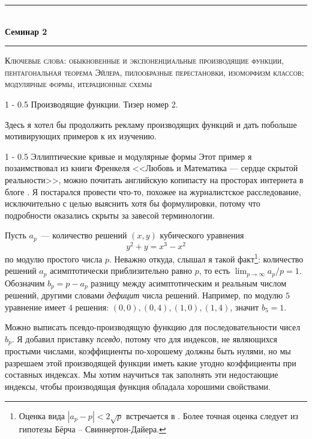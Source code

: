 \documentclass{article}
\makeatletter
\def \topic {Семинар 2}
\theoremstyle{definition}
\renewcommand{\section}{\@startsection
{section}%
{1}%
{\z@}%
{-\baselineskip}%
{0.5\baselineskip}%
{\centering\large\scshape}} %
\renewcommand{\subsection}{\@startsection
{subsection}%
{1}%
{\z@}%
{-\baselineskip}%
{0.5\baselineskip}%
{\centering\large\scshape}} %
\makeatother
\begin{document}
\begin{center}

\newcommand{\HRule}{\rule{\linewidth}{0.5mm}}
\HRule \\[0.2cm]
{ \Large \bfseries \topic} %
\HRule

\end{center}

\textsc{Ключевые слова: обыкновенные и экспоненциальные производящие функции, пентагональная теорема Эйлера, пилообразные перестановки, изоморфизм классов; модулярные формы, итерационные схемы}

\section{Производящие функции. Тизер номер 2.}

Здесь я хотел бы продолжить рекламу производящих функций и дать побольше 
мотивирующих примеров к их изучению. 

\subsection{Эллиптические кривые и модулярные формы}
Этот пример я позаимствовал из книги Френкеля <<Любовь и Математика --- сердце скрытой реальности>>, можно почитать английскую копипасту на просторах интернета в блоге \cite{shimura-taniyama}. Я постарался провести что-то, похожее на журналистское расследование, исключительно с целью выяснить хотя бы формулировки, потому что подробности оказались скрыты за завесой терминологии.

Пусть \( a_p \)~--- количество решений \( (x, y) \) кубического уравнения
\[
	y^2 + y = x^3 - x^2
\]
по модулю простого числа \( p \). Неважно откуда, слышал я такой факт\footnote{Оценка вида \( |a_p - p| < 2 \sqrt p \) встречается в \cite[Theorem 477]{number_theory}. Более точная оценка следует из гипотезы Бёрча -- Свиннертон-Дайера.}: количество решений \( a_p \) асимптотически приблизительно равно \( p \), то есть \( \lim_{p \to \infty} a_p / p = 1 \). Обозначим \( b_p = p - a_p \) разницу между асимптотическим и реальным числом решений, другими словами \textit{дефицит} числа решений. Например, по модулю \( 5 \) уравнение имеет \( 4 \) решения: \( (0,0 ), (0, 4), (1,0), (1,4) \), значит \( b_5 = 1 \).


Можно выписать псевдо-производящую функцию для последовательности чисел \( b_p \). Я добавил приставку \textit{псевдо}, потому что для индексов, не являющихся простыми числами, коэффициенты по-хорошему должны быть нулями, но мы разрешаем этой производящей функции иметь какие угодно коэффициенты при составных индексах. Мы хотим научиться так заполнять эти недостающие индексы, чтобы производящая функция обладала хорошими свойствами.
\end{document}

